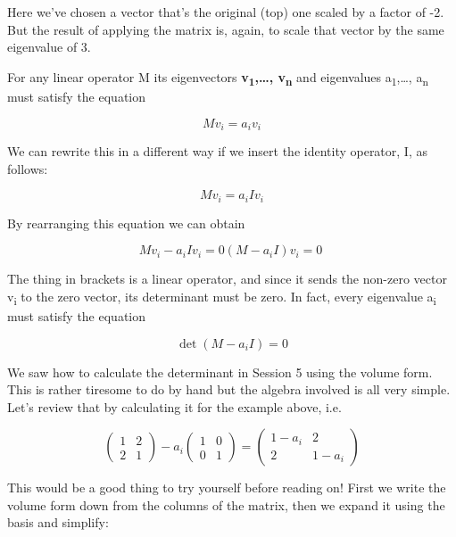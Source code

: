 \documentclass[oneside,english]{amsbook}
\numberwithin{section}{chapter}
\theoremstyle{plain}
\theoremstyle{definition}
\begin{document}
Here we've chosen a vector that's the original (top) one scaled by a
factor of -2. But the result of applying the matrix is, again, to scale
that vector by the same eigenvalue of 3.

For any linear operator M its eigenvectors
\textbf{v\textsubscript{1},\ldots, v\textsubscript{n}} and eigenvalues
a\textsubscript{1},\ldots, a\textsubscript{n} must satisfy the equation

\[Mv_{i} = a_{i}v_{i}\]

We can rewrite this in a different way if we insert the identity
operator, I, as follows:

\[Mv_{i} = a_{i}Iv_{i}\]

By rearranging this equation we can obtain

\[{Mv_{i} - a_{i}Iv_{i} = 0
}{\left( M - a_{i}I \right)v_{i} = 0\ }\]

The thing in brackets is a linear operator, and since it sends the
non-zero vector v\textsubscript{i} to the zero vector, its determinant
must be zero. In fact, every eigenvalue a\textsubscript{i} must satisfy
the equation

\[\det\left( M - a_{i}I \right) = 0\]

We saw how to calculate the determinant in Session 5 using the volume
form. This is rather tiresome to do by hand but the algebra involved is
all very simple. Let's review that by calculating it for the example
above, i.e.

\[\begin{pmatrix}
	1 & 2 \\
	2 & 1
\end{pmatrix} - a_{i}\begin{pmatrix}
	1 & 0 \\
	0 & 1
\end{pmatrix} = \begin{pmatrix}
	1 - a_{i} & 2 \\
	2 & 1 - a_{i}
\end{pmatrix}\]

This would be a good thing to try yourself before reading on! First we
write the volume form down from the columns of the matrix, then we
expand it using the basis and simplify:
\end{document}
